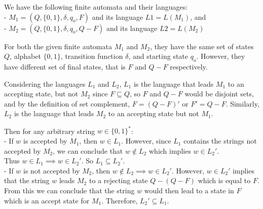 \documentclass[a4paper]{exam}
\begin{document}
\begin{questions}
\begin{solution}


We have the following finite automata and their languages: \\
- $ M_1 = (Q, \{0, 1\}, \delta, q_o, F) $ and its language $ L1 = L(M_1) $, and \\
- $ M_2 = (Q, \{0, 1\}, \delta, q_o, Q - F) $ and its language $ L2 = L(M_2) $

For both the given finite automata $M_1$ and $M_2$, they have the same set of states $Q$, alphabet $\{ 0, 1\}$, transition function $\delta$, and starting state $q_o$. However, they have different set of final states, that is $F$ and $Q - F$ respectively.



Considering the languages $L_1$ and $L_2$, $L_1$ is the language that leads $M_1$ to an accepting state, but not $M_2$ since $ F \subseteq Q $, so $F$ and $Q - F$ would be disjoint sets, and by the definition of set complement, $ F = (Q - F)' $ or $ F' = Q - F $. Similarly, $L_2$ is the language that leads $M_2$ to an accepting state but not $M_1$.

Then for any arbitrary string $ w \in \{0, 1\}^* $: \\
- If $ w $ is accepted by $M_1$, then $ w \in L_1 $. However, since $L_1$ contains the strings not \hspace*{1.45mm} accepted by $M_2$, we can conclude that $ w \notin L_2 $ which implies $ w \in L_2' $. \\ \hspace*{1.45mm} Thus $ w \in L_1 \implies w \in L_2' $. So $ L_1 \subseteq L_2' $. \\
- If $w$ is not accepted by $M_2$, then $ w \notin L_2 \implies w \in L_2' $. However, $ w \in L_2' $ implies that \hspace*{1.45mm} the string $w$ leads $M_2$ to a rejecting state $ Q - (Q - F) $ which is equal to $F$. From this \hspace*{1.45mm} we can conclude that the string $w$ would then lead to a state in $F$ which is an accept \hspace*{1.45mm} state for $M_1$. Therefore, $L_2' \subseteq L_1$.


\end{solution}
\end{questions}
\end{document}
